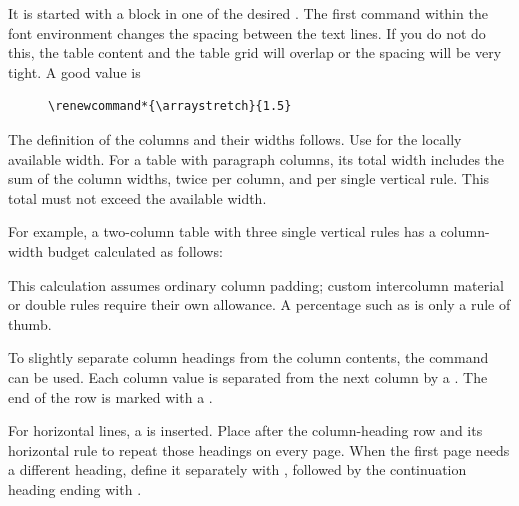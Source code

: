 It is started with a block in one of the desired .
The first command within the font environment changes the spacing between the
text lines. If you do not do this, the table content and the table grid will
overlap or the spacing will be very tight. A good value is

\begin{figure}[H]
    \small
    \centering
    \begin{BVerbatim}
\renewcommand*{\arraystretch}{1.5}
    \end{BVerbatim}
\end{figure}

The definition of the columns and their widths follows. Use
 for the locally available width.
For a table with paragraph columns, its total width includes the sum of the
column widths, twice  per column,
and  per single vertical rule.
This total must not exceed the available width.

For example, a two-column table with three single vertical rules has a
column-width budget calculated as follows:
\begin{quote}
\end{quote}
This calculation assumes ordinary column padding; custom intercolumn material
or double rules require their own allowance. A percentage such as
 is only a rule of thumb.
\bigbreak

To slightly separate column headings from the column contents, the\linebreak
{} command can be used. Each
column value is separated from the next column by a \tsTextMonospace{\&}. The end
of the row is marked with a \tsTextMonospace{\tsBackslash{}\tsBackslash{}}.
\bigbreak

For horizontal lines, a  is inserted.
Place  after the column-heading row
and its horizontal rule to repeat those headings on every page.
When the first page needs a different heading, define it separately with
, followed by the continuation
heading ending with .
\bigbreak

